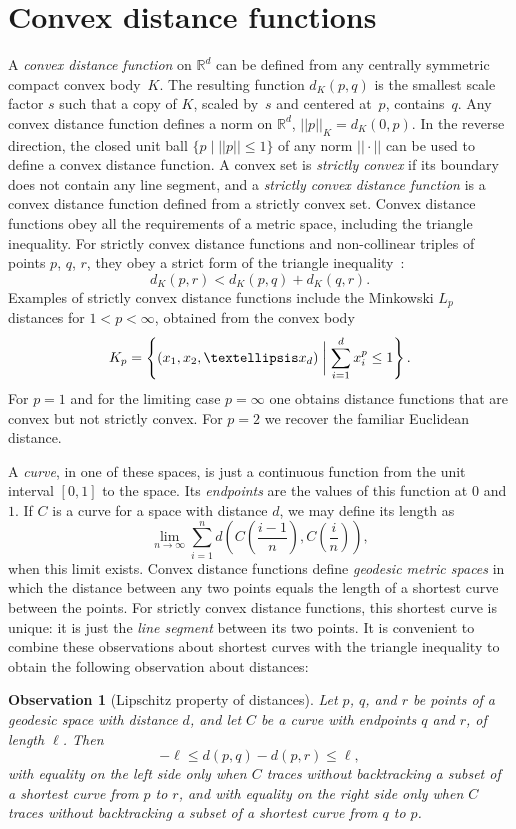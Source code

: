 \documentclass[11pt]{article}
\newtheorem{observation}[lemma]{Observation}
\theoremstyle{definition}
\begin{document}
\section{Convex distance functions}
\label{sec:dist-fun}

A \emph{convex distance function} on $\mathbb{R}^d$ can be defined from any centrally symmetric compact convex body~$K$. The resulting function $d_K(p,q)$ is the smallest scale factor $s$ such that a copy of $K$, scaled by~$s$ and centered at~$p$, contains~$q$. Any convex distance function defines a norm on $\mathbb{R}^d$, $||p||_K=d_K(0,p)$. In the reverse direction, the closed unit ball $\{p\mid||p||\le 1\}$ of any norm $||\cdot||$ can be used to define a convex distance function. A convex set is \emph{strictly convex} if its boundary does not contain any line segment, and a \emph{strictly convex distance function} is a convex distance function defined from a strictly convex set. Convex distance functions obey all the requirements of a metric space, including the triangle inequality. For strictly convex distance functions and non-collinear triples of points $p$, $q$, $r$, they obey a strict form of the triangle inequality~\cite{CheDry-SoCG-85}:
\[
d_K(p,r)<d_K(p,q)+d_K(q,r).
\]
Examples of strictly convex distance functions include the Minkowski $L_p$ distances for $1<p<\infty$, obtained from the convex body
\[
K_p = \left\{ (x_1,x_2,\dots x_d) \biggm\vert \sum_{i=1}^d x_i^p \le 1 \right\}.
\]
For $p=1$ and for the limiting case $p=\infty$ one obtains distance functions that are convex but not strictly convex. For $p=2$ we recover the familiar Euclidean distance.
\iffull

A \emph{curve}, in one of these spaces, is just a continuous function from the unit interval $[0,1]$ to the space. Its \emph{endpoints} are the values of this function at $0$ and $1$. If $C$ is a curve for a space with distance $d$, we may define its length as
\[
\lim_{n\to \infty} \sum_{i=1}^n d\left(C\left(\frac{i-1}{n}\right),C\left(\frac{i}{n}\right)\right),
\]
when this limit exists.
\fi
Convex distance functions define \emph{geodesic metric spaces} in which the distance between any two points equals the length of a shortest curve between the points. For strictly convex distance functions, this shortest curve is unique: it is just the \emph{line segment} between its two points.
\iffull
It is convenient to combine these observations about shortest curves with the triangle inequality to obtain the following observation about distances:

\begin{observation}[Lipschitz property of distances]
\label{obs:lipschitz}
Let $p$, $q$, and $r$ be points of a geodesic space with distance $d$, and let $C$ be a curve with endpoints $q$ and $r$, of length $\ell$. Then
\[
-\ell\le d(p,q)-d(p,r)\le\ell,
\]
with equality on the left side only when $C$ traces without backtracking a subset of a shortest curve from $p$ to $r$, and with
equality on the right side only when $C$ traces without backtracking a subset of a shortest curve from $q$ to $p$.
\end{observation}
\end{document}
